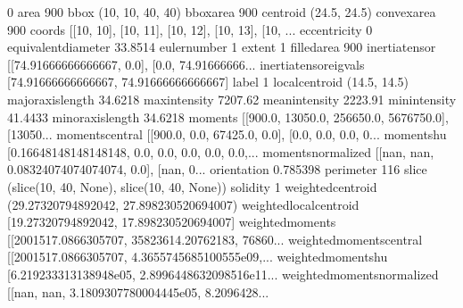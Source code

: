 \documentclass[letterpaper,10pt,english]{sphinxmanual}
\begin{document}
\begin{sphinxVerbatim}[commandchars=\\\{\}]
                                                                             0
area                                                                       900
bbox                                                          (10, 10, 40, 40)
bbox\PYGZus{}area                                                                  900
centroid                                                          (24.5, 24.5)
convex\PYGZus{}area                                                                900
coords                       [[10, 10], [10, 11], [10, 12], [10, 13], [10, ...
eccentricity                                                                 0
equivalent\PYGZus{}diameter                                                    33.8514
euler\PYGZus{}number                                                                 1
extent                                                                       1
filled\PYGZus{}area                                                                900
inertia\PYGZus{}tensor               [[74.91666666666667, \PYGZhy{}0.0], [\PYGZhy{}0.0, 74.91666666...
inertia\PYGZus{}tensor\PYGZus{}eigvals                  [74.91666666666667, 74.91666666666667]
label                                                                        1
local\PYGZus{}centroid                                                    (14.5, 14.5)
major\PYGZus{}axis\PYGZus{}length                                                      34.6218
max\PYGZus{}intensity                                                          7207.62
mean\PYGZus{}intensity                                                         2223.91
min\PYGZus{}intensity                                                          41.4433
minor\PYGZus{}axis\PYGZus{}length                                                      34.6218
moments                      [[900.0, 13050.0, 256650.0, 5676750.0], [13050...
moments\PYGZus{}central              [[900.0, 0.0, 67425.0, 0.0], [0.0, 0.0, 0.0, 0...
moments\PYGZus{}hu                   [0.16648148148148148, 0.0, 0.0, 0.0, 0.0, 0.0,...
moments\PYGZus{}normalized           [[nan, nan, 0.08324074074074074, 0.0], [nan, 0...
orientation                                                           0.785398
perimeter                                                                  116
slice                               (slice(10, 40, None), slice(10, 40, None))
solidity                                                                     1
weighted\PYGZus{}centroid                      (29.27320794892042, 27.898230520694007)
weighted\PYGZus{}local\PYGZus{}centroid                [19.27320794892042, 17.898230520694007]
weighted\PYGZus{}moments             [[2001517.0866305707, 35823614.20762183, 76860...
weighted\PYGZus{}moments\PYGZus{}central     [[2001517.0866305707, \PYGZhy{}4.3655745685100555e\PYGZhy{}09,...
weighted\PYGZus{}moments\PYGZus{}hu          [6.219233313138948e\PYGZhy{}05, 2.8996448632098516e\PYGZhy{}11...
weighted\PYGZus{}moments\PYGZus{}normalized  [[nan, nan, 3.1809307780004445e\PYGZhy{}05, \PYGZhy{}8.2096428...
\end{sphinxVerbatim}
\end{document}
